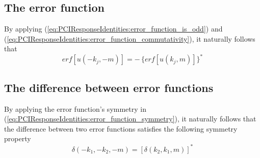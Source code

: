 \subsection{The error function}
By applying (\ref{eq:PCIResponseIdentities:error_function_is_odd}) and
(\ref{eq:PCIResponseIdentities:error_function_commutativity}),
it naturally follows that
\begin{equation}
  erf[u(-k_j, -m)] = - \, \{ erf[u(k_j, m)] \}^*
  \label{eq:PCIResponseIdentities:error_function_symmetry}
\end{equation}


\subsection{The difference between error functions}
By applying the error function's symmetry in
(\ref{eq:PCIResponseIdentities:error_function_symmetry}),
it naturally follows that
the difference between two error functions
satisfies the following symmetry property
\begin{equation}
  \delta(-k_1, -k_2, -m)
  =
  [\delta(k_2, k_1, m)]^*
  \label{eq:PCIResponseIdentities:difference_of_error_functions_symmetry}
\end{equation}


